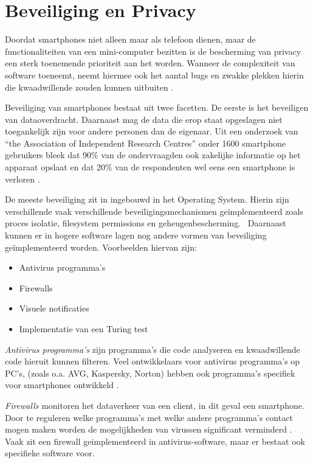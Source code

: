 \chapter{Beveiliging en Privacy}

Doordat smartphones niet alleen maar als telefoon dienen, maar de functionaliteiten van een mini-computer bezitten is de bescherming van privacy een sterk toenemende prioriteit aan het worden. Wanneer de complexiteit van software toeneemt, neemt hiermee ook het aantal bugs en zwakke plekken hierin die kwaadwillende zouden kunnen uitbuiten \citep{portokalidis2010paranoid}. 

Beveiliging van smartphones bestaat uit twee facetten. De eerste is het beveiligen van dataoverdracht. Daarnaast mag de data die erop staat opgeslagen niet toegankelijk zijn voor andere personen dan de eigenaar. Uit een onderzoek van ``the Association of Independent Research Centres'' onder 1600 smartphone gebruikers bleek dat 90\% van de ondervraagden ook zakelijke informatie op het apparaat opslaat en dat 20\% van de respondenten wel eens een smartphone is verloren \citep{charles2011}.  

De meeste beveiliging zit in ingebouwd in het Operating System. Hierin zijn verschillende vaak verschillende beveiligingsmechanismen geïmplementeerd zoals proces isolatie, filesystem permissions en geheugenbescherming.  Daarnaast kunnen er in hogere software lagen nog andere vormen van beveiliging geïmplementeerd worden. Voorbeelden hiervan zijn: 

\begin{itemize}
   \item Antivirus programma’s
   \item Firewalls
   \item Visuele notificaties
   \item Implementatie van een Turing test
\end{itemize}

\emph{Antivirus programma’s} zijn programma’s die code analyseren en kwaadwillende code hieruit kunnen filteren. Veel ontwikkelaars voor antivirus programma’s op PC’s, (zoals o.a. AVG, Kaspersky, Norton) hebben ook programma’s specifiek voor smartphones ontwikkeld \citep{becher2009security}. 

\emph{Firewalls} monitoren het dataverkeer van een client, in dit geval een smartphone. Door te reguleren welke programma’s met welke andere programma’s contact mogen maken worden de mogelijkheden van virussen significant verminderd \citep{becher2009security}. Vaak zit een firewall geimplementeerd in antivirus-software, maar er bestaat ook specifieke software voor. 


